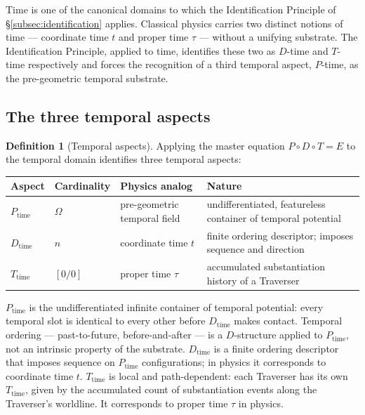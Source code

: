 \documentclass[11pt,a4paper]{article}
\theoremstyle{definition}
\newtheorem{definition}[theorem]{Definition}
\theoremstyle{remark}
\newcommand{\PDT}{\ensuremath{P{\circ}D{\circ}T}}
\begin{document}
Time is one of the canonical domains to which the Identification Principle of \S\ref{subsec:identification} applies. Classical physics carries two distinct notions of time --- coordinate time $t$ and proper time $\tau$ --- without a unifying substrate. The Identification Principle, applied to time, identifies these two as $D$-time and $T$-time respectively and forces the recognition of a third temporal aspect, $P$-time, as the pre-geometric temporal substrate.

\subsection{The three temporal aspects}

\begin{definition}[Temporal aspects]\label{def:temporal-aspects}
Applying the master equation $\PDT = E$ to the temporal domain identifies three temporal aspects:

\begin{center}
\begin{tabularx}{\textwidth}{@{}llXX@{}}
\toprule
\textbf{Aspect} & \textbf{Cardinality} & \textbf{Physics analog} & \textbf{Nature}\\
\midrule
$P_{\text{time}}$ & $\Omega$ & pre-geometric temporal field
  & undifferentiated, featureless container of temporal potential\\
$D_{\text{time}}$ & $n$ & coordinate time $t$
  & finite ordering descriptor; imposes sequence and direction\\
$T_{\text{time}}$ & $[0/0]$ & proper time $\tau$
  & accumulated substantiation history of a Traverser\\
\bottomrule
\end{tabularx}
\end{center}
\end{definition}

$P_{\text{time}}$ is the undifferentiated infinite container of temporal potential: every temporal slot is identical to every other before $D_{\text{time}}$ makes contact. Temporal ordering --- past-to-future, before-and-after --- is a $D$-structure applied to $P_{\text{time}}$, not an intrinsic property of the substrate. $D_{\text{time}}$ is a finite ordering descriptor that imposes sequence on $P_{\text{time}}$ configurations; in physics it corresponds to coordinate time $t$. $T_{\text{time}}$ is local and path-dependent: each Traverser has its own $T_{\text{time}}$, given by the accumulated count of substantiation events along the Traverser's worldline. It corresponds to proper time $\tau$ in physics.
\end{document}
